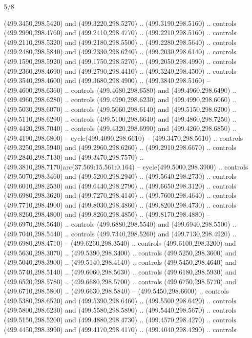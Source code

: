 \begin{flagdescription}{5/8}
\begin{scope}[xshift=0.5\flaglength,yshift=0.5\flagwidth,scale=\flagwidth/475.63]
\begin{scope}[y=0.8pt, x=0.8pt, yscale=-1, xscale=1,shift={(-450,-300)}]
\begin{scope}[cm={{1.0,0.0,0.0,1.0,(-0.0002,0.12556)}},cm={{1.0,0.0,0.0,1.0,(0.00179,0.0)}}]
\begin{scope}[cm={{1.11592,0.0,0.0,1.11592,(-106.89933,-41.77764)}}]
\begin{scope}[draw=black,fill=cfff]
\begin{scope}[fill=black]
  (499.3450,298.5420) and (499.3220,298.5270) .. (499.3190,298.5160) .. controls
  (499.2990,298.4760) and (499.2410,298.4770) .. (499.2210,298.5160) .. controls
  (499.2110,298.5320) and (499.2180,298.5500) .. (499.2280,298.5640) .. controls
  (499.2480,298.5840) and (499.2330,298.6240) .. (499.2030,298.6140) .. controls
  (499.1590,298.5920) and (499.1750,298.5270) .. (499.2050,298.4990) .. controls
  (499.2360,298.4690) and (499.2790,298.4410) .. (499.3240,298.4500) .. controls
  (499.3540,298.4600) and (499.3680,298.4900) .. (499.3840,298.5160) --
  (499.4600,298.6360) .. controls (499.4680,298.6580) and (499.4960,298.6490) ..
  (499.4960,298.6280) .. controls (499.4990,298.6230) and (499.4990,298.6060) ..
  (499.5030,298.6070) .. controls (499.5060,298.6140) and (499.5150,298.6200) ..
  (499.5110,298.6290) .. controls (499.5100,298.6640) and (499.4860,298.7250) ..
  (499.4420,298.7040) .. controls (499.4320,298.6990) and (499.4260,298.6850) ..
  (499.4190,298.6800) -- cycle(499.4090,298.6610) -- (499.3470,298.5610) ..
  controls (499.3250,298.5940) and (499.2960,298.6260) .. (499.2910,298.6670) ..
  controls (499.2840,298.7130) and (499.3470,298.7570) ..
  (499.3810,298.7170)arc(37.569:15.561:0.164) -- cycle(499.5000,298.3900) ..
  controls (499.5070,298.3460) and (499.5200,298.2940) .. (499.5640,298.2730) ..
  controls (499.6010,298.2530) and (499.6440,298.2790) .. (499.6650,298.3120) ..
  controls (499.6980,298.3620) and (499.7270,298.4140) .. (499.7600,298.4640) ..
  controls (499.7710,298.4900) and (499.8030,298.4860) .. (499.8200,298.4730) ..
  controls (499.8260,298.4800) and (499.8260,298.4850) .. (499.8170,298.4880) --
  (499.6970,298.5640) .. controls (499.6880,298.5540) and (499.6940,298.5500) ..
  (499.7040,298.5440) .. controls (499.7340,298.5260) and (499.7130,298.4920) ..
  (499.6980,298.4710) -- (499.6260,298.3540) .. controls (499.6100,298.3200) and
  (499.5630,298.3070) .. (499.5390,298.3400) .. controls (499.5250,298.3600) and
  (499.5040,298.3900) .. (499.5140,298.4140) .. controls (499.5450,298.4640) and
  (499.5740,298.5140) .. (499.6060,298.5630) .. controls (499.6180,298.5930) and
  (499.6520,298.5780) .. (499.6680,298.5700) .. controls (499.6750,298.5770) and
  (499.6710,298.5800) .. (499.6630,298.5840) -- (499.5450,298.6600) .. controls
  (499.5380,298.6520) and (499.5390,298.6460) .. (499.5500,298.6420) .. controls
  (499.5800,298.6230) and (499.5580,298.5890) .. (499.5440,298.5670) .. controls
  (499.5150,298.5200) and (499.4880,298.4730) .. (499.4570,298.4270) .. controls
  (499.4450,298.3990) and (499.4170,298.4170) .. (499.4040,298.4290) .. controls

\end{scope}
\end{scope}
\end{scope}
\end{scope}
\end{scope}
\end{scope}
\end{flagdescription}
